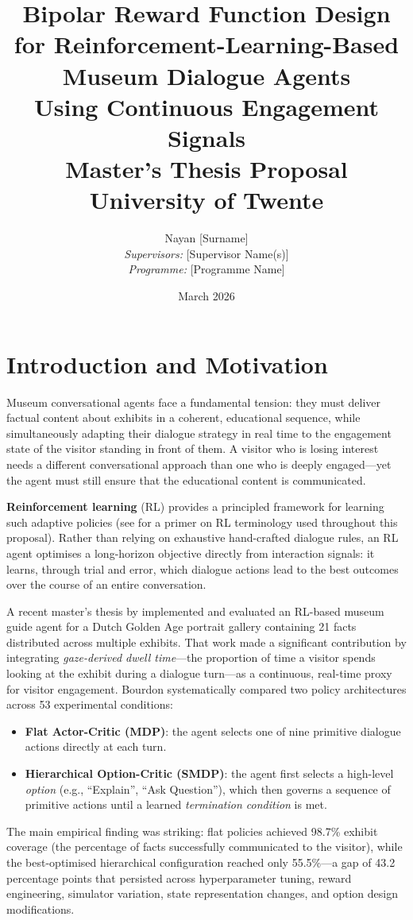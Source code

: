 \documentclass[12pt,a4paper]{article}
\title{%
    \textbf{Bipolar Reward Function Design for Reinforcement-Learning-Based Museum Dialogue Agents} \\[6pt]
    \large Using Continuous Engagement Signals \\[12pt]
    \normalsize Master's Thesis Proposal \\
    University of Twente
}
\author{
    Nayan [Surname] \\
    \textit{Supervisors:} [Supervisor Name(s)] \\
    \textit{Programme:} [Programme Name]
}
\date{March 2026}
\begin{document}
\maketitle
\thispagestyle{empty}
\newpage

\tableofcontents
\newpage

\section{Introduction and Motivation}
\label{sec:intro}

Museum conversational agents face a fundamental tension: they must deliver factual content about exhibits in a coherent, educational sequence, while simultaneously adapting their dialogue strategy in real time to the engagement state of the visitor standing in front of them. A visitor who is losing interest needs a different conversational approach than one who is deeply engaged---yet the agent must still ensure that the educational content is communicated.

\textbf{Reinforcement learning} (RL) provides a principled framework for learning such adaptive policies (see  for a primer on RL terminology used throughout this proposal). Rather than relying on exhaustive hand-crafted dialogue rules, an RL agent optimises a long-horizon objective directly from interaction signals: it learns, through trial and error, which dialogue actions lead to the best outcomes over the course of an entire conversation.

A recent master's thesis by \citet{bourdon2025} implemented and evaluated an RL-based museum guide agent for a Dutch Golden Age portrait gallery containing 21 facts distributed across multiple exhibits. That work made a significant contribution by integrating \emph{gaze-derived dwell time}---the proportion of time a visitor spends looking at the exhibit during a dialogue turn---as a continuous, real-time proxy for visitor engagement. Bourdon systematically compared two policy architectures across 53 experimental conditions:
\begin{itemize}[nosep]
    \item \textbf{Flat Actor-Critic (MDP)}: the agent selects one of nine primitive dialogue actions directly at each turn.
    \item \textbf{Hierarchical Option-Critic (SMDP)}: the agent first selects a high-level \emph{option} (e.g., ``Explain'', ``Ask Question''), which then governs a sequence of primitive actions until a learned \emph{termination condition} is met.
\end{itemize}
The main empirical finding was striking: flat policies achieved 98.7\% exhibit coverage (the percentage of facts successfully communicated to the visitor), while the best-optimised hierarchical configuration reached only 55.5\%---a gap of 43.2 percentage points that persisted across hyperparameter tuning, reward engineering, simulator variation, state representation changes, and option design modifications.
\end{document}
